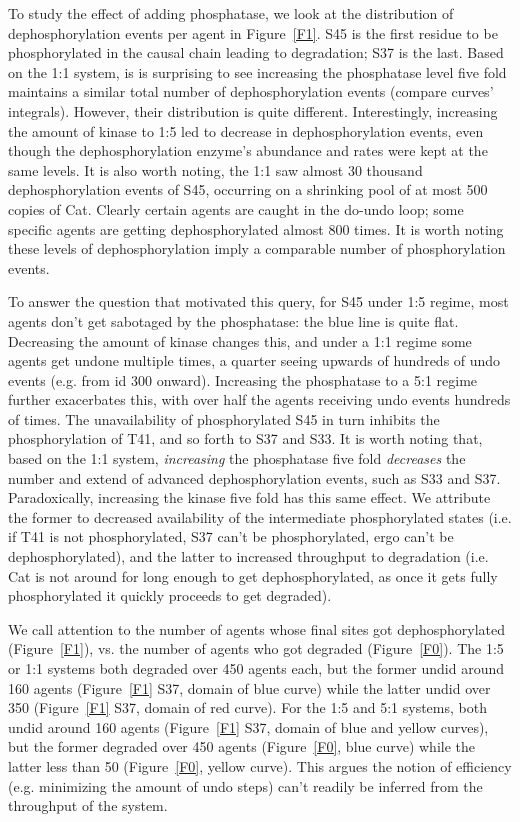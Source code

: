 To study the effect of adding phosphatase, we look at the
distribution of dephosphorylation events per agent in Figure~\ref{F1}.
S45 is the first residue to be phosphorylated in the causal chain
leading to degradation; S37 is the last. Based on the 1:1 system, is is surprising to
see increasing the phosphatase level five fold maintains a similar
total number of dephosphorylation events (compare curves’ integrals).
However, their distribution is quite different.
Interestingly, increasing the amount of kinase to 1:5 led to decrease
in dephosphorylation events, even though the dephosphorylation enzyme's
abundance and rates were kept at the same levels.
It is also worth noting, the 1:1 saw almost 30 thousand dephosphorylation
events of S45, occurring on a shrinking pool of at most 500 copies of Cat.
Clearly certain agents are caught in the do-undo loop; some specific
agents are getting dephosphorylated almost 800 times. It is worth noting
these levels of dephosphorylation imply a comparable number of
phosphorylation events.

To answer the question that motivated this query, for S45 under 1:5 regime,
most agents don’t get sabotaged by the phosphatase: the blue line is
quite flat. Decreasing the amount of kinase changes this, and
under a 1:1 regime some agents get undone multiple times, a quarter
seeing upwards of hundreds of undo events (e.g. from id 300
onward). Increasing the phosphatase to a 5:1 regime further
exacerbates this, with over half the agents receiving undo events
hundreds of times. The unavailability of phosphorylated S45 in turn
inhibits the phosphorylation of T41, and so forth to S37 and S33. It
is worth noting that, based on the 1:1 system, \emph{increasing} the
phosphatase five fold \emph{decreases} the number and extend of advanced
dephosphorylation events, such as S33 and S37. Paradoxically,
increasing the kinase five fold has this same effect. We attribute the
former to decreased availability of the intermediate phosphorylated
states (i.e. if T41 is not phosphorylated, S37 can’t be
phosphorylated, ergo can’t be dephosphorylated), and the latter to
increased throughput to degradation (i.e. Cat is not around for long
enough to get dephosphorylated, as once it gets fully phosphorylated it
quickly proceeds to get degraded).

We call attention to the number of agents whose final sites got
dephosphorylated (Figure~\ref{F1}), vs. the number of agents who got
degraded (Figure~\ref{F0}). The 1:5 or 1:1 systems both degraded over
450 agents each, but the former undid around 160 agents (Figure~\ref{F1} S37, domain of blue curve) while the
latter undid over 350 (Figure~\ref{F1} S37, domain of red curve). For the 1:5 and 5:1 systems, both undid around
160 agents (Figure~\ref{F1} S37, domain of blue and yellow curves), but the former degraded over 450 agents (Figure~\ref{F0}, blue curve) while the latter
less than 50 (Figure~\ref{F0}, yellow curve). This argues the notion of efficiency (e.g. minimizing
the amount of undo steps) can’t readily be inferred from the
throughput of the system.


